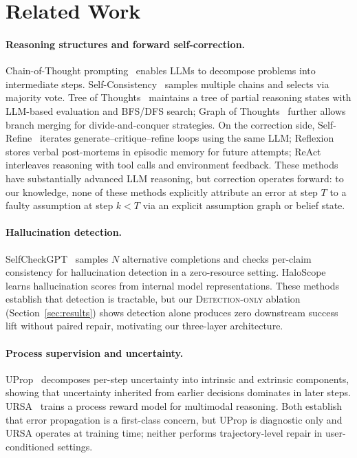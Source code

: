\section{Related Work}
\label{sec:related}

\paragraph{Reasoning structures and forward self-correction.}
Chain-of-Thought prompting~\citep{wei2022cot} enables LLMs to decompose problems
into intermediate steps. Self-Consistency~\citep{wang2023selfconsistency} samples
multiple chains and selects via majority vote. Tree of Thoughts~\citep{yao2023tot}
maintains a tree of partial reasoning states with LLM-based evaluation and
BFS/DFS search; Graph of Thoughts~\citep{besta2024got} further allows branch
merging for divide-and-conquer strategies. On the correction side,
Self-Refine~\citep{madaan2023selfrefine} iterates generate--critique--refine
loops using the same LLM; Reflexion~\citep{shinn2023reflexion} stores verbal
post-mortems in episodic memory for future attempts; ReAct~\citep{yao2023react}
interleaves reasoning with tool calls and environment feedback. These methods
have substantially advanced LLM reasoning, but correction operates forward: to
our knowledge, none of these methods explicitly attribute an error at step $T$
to a faulty assumption at step $k<T$ via an explicit assumption graph or belief
state.

\paragraph{Hallucination detection.}
SelfCheckGPT~\citep{manakul2023selfcheckgpt} samples $N$ alternative completions
and checks per-claim consistency for hallucination detection in a zero-resource
setting. HaloScope~\citep{du2024haloscope} learns hallucination scores from
internal model representations. These methods establish that detection is
tractable, but our \textsc{Detection-only} ablation (Section~\ref{sec:results})
shows detection alone produces zero downstream success lift without paired
repair, motivating our three-layer architecture.

\paragraph{Process supervision and uncertainty.}
UProp~\citep{duan2025uprop} decomposes per-step uncertainty into intrinsic
and extrinsic components, showing that uncertainty inherited from earlier
decisions dominates in later steps. URSA~\citep{luo2025ursa} trains a process
reward model for multimodal reasoning. Both establish that error propagation
is a first-class concern, but UProp is diagnostic only and URSA operates at
training time; neither performs trajectory-level repair in user-conditioned
settings.

